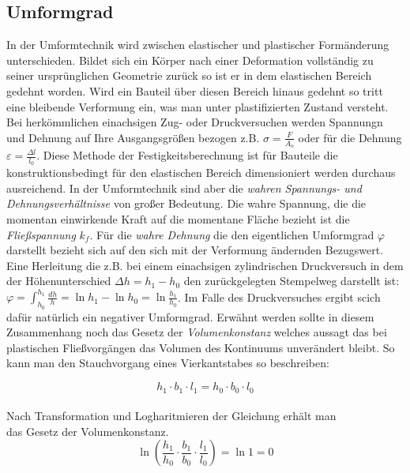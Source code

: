 \documentclass[12pt,a4paper,parskip]{scrartcl}
\begin{document}
\subsection{Umformgrad}
In der Umformtechnik wird zwischen elastischer und plastischer Formänderung unterschieden. Bildet sich ein Körper nach einer Deformation vollständig zu seiner ursprünglichen Geometrie zurück so ist er in dem elastischen Bereich gedehnt worden. Wird ein Bauteil über diesen Bereich hinaus gedehnt so tritt eine bleibende Verformung ein, was man unter plastifizierten Zustand versteht.  Bei herkömmlichen einachsigen Zug- oder Druckversuchen werden Spannungn und Dehnung auf Ihre Ausgangsgrößen bezogen z.B. $ \sigma=\frac{F}{A_o} $ oder für die Dehnung $ \varepsilon = \frac{\Delta l}{l_0} $. Diese Methode der Festigkeitsberechnung ist für Bauteile die konstruktionsbedingt für den elastischen Bereich dimensioniert werden   durchaus ausreichend. In der Umformtechnik sind aber die \emph{wahren Spannungs- und Dehnungsverhältnisse} von großer Bedeutung. Die wahre Spannung, die die momentan einwirkende Kraft auf die momentane Fläche bezieht ist die \emph{Fließspannung} $ k_f $. Für die \emph{wahre Dehnung} die den eigentlichen Umformgrad $ \varphi $ darstellt bezieht sich auf den sich mit der Verformung ändernden Bezugswert. Eine Herleitung die z.B. bei einem einachsigen zylindrischen Druckversuch in dem der Höhenunterschied $ \Delta h=h_1-h_0 $ den zurückgelegten Stempelweg darstellt ist: $ \varphi=\int_{h_0}^{h_1}\frac{dh}{h}=\ln h_1 - \ln h_0 = \ln\frac{h_1}{h_0}$. Im Falle des Druckversuches ergibt scich dafür natürlich ein negativer Umformgrad. Erwähnt werden sollte in diesem Zusammenhang noch das Gesetz der \emph{Volumenkonstanz} welches aussagt das  bei plastischen Fließvorgängen das Volumen des Kontinuums unverändert bleibt. So kann man den Stauchvorgang eines Vierkantstabes so beschreiben: 




\[ h_1 \cdot  b_1 \cdot l_1 = h_0 \cdot b_0 \cdot l_0 \]\\
Nach Transformation und Logharitmieren der Gleichung erhält man\\
das Gesetz der Volumenkonstanz. \\
\[ \ln (\frac{h_1}{h_0} \cdot \frac{b_1}{b_0} \cdot \frac{l_1}{l_0}) = \ln 1 = 0 \]
 
\end{document}
